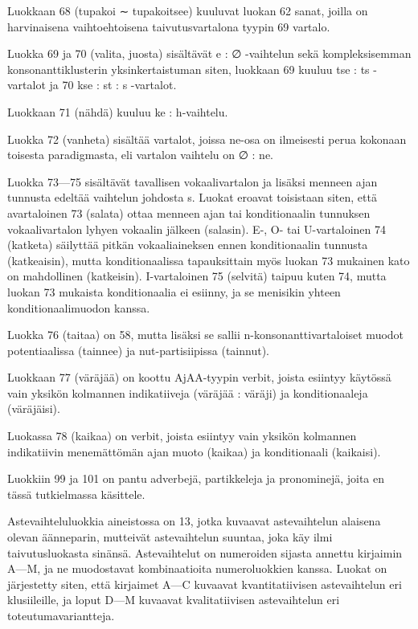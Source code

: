 \documentclass[free]{flammie}
\begin{document}
Luokkaan 68 (tupakoi ∼ tupakoitsee) kuuluvat luokan 62 sanat, joilla on harvinaisena vaihtoehtoisena taivutusvartalona tyypin 69 vartalo.

Luokka 69 ja 70 (valita, juosta) sisältävät e : ∅ -vaihtelun sekä kompleksisemman
konsonanttiklusterin yksinkertaistuman siten, luokkaan 69 kuuluu tse : ts -vartalot ja 70 kse : st : s -vartalot.

Luokkaan 71 (nähdä) kuuluu ke : h-vaihtelu.

Luokka 72 (vanheta) sisältää vartalot, joissa ne-osa on ilmeisesti perua kokonaan
toisesta paradigmasta, eli vartalon vaihtelu on ∅ : ne.

Luokka 73—75 sisältävät tavallisen vokaalivartalon ja lisäksi menneen ajan
tunnusta edeltää vaihtelun johdosta s. Luokat eroavat toisistaan siten, että avartaloinen 73 (salata) ottaa menneen ajan tai konditionaalin tunnuksen vokaalivartalon lyhyen vokaalin jälkeen (salasin). E-, O- tai U-vartaloinen 74 (katketa)
säilyttää pitkän vokaaliaineksen ennen konditionaalin tunnusta (katkeaisin), mutta konditionaalissa tapauksittain myös luokan 73 mukainen kato on mahdollinen
(katkeisin). I-vartaloinen 75 (selvitä) taipuu kuten 74, mutta luokan 73 mukaista
konditionaalia ei esiinny, ja se menisikin yhteen konditionaalimuodon kanssa.

Luokka 76 (taitaa) on 58, mutta lisäksi se sallii n-konsonanttivartaloiset muodot
potentiaalissa (tainnee) ja nut-partisiipissa (tainnut).

Luokkaan 77 (väräjää) on koottu AjAA-tyypin verbit, joista esiintyy käytössä
vain yksikön kolmannen indikatiiveja (väräjää : väräji) ja konditionaaleja (väräjäisi).

Luokassa 78 (kaikaa) on verbit, joista esiintyy vain yksikön kolmannen indikatiivin menemättömän ajan muoto (kaikaa) ja konditionaali (kaikaisi).

Luokkiin 99 ja 101 on pantu adverbejä, partikkeleja ja pronominejä, joita en tässä
tutkielmassa käsittele.

Astevaihteluluokkia aineistossa on 13, jotka kuvaavat astevaihtelun alaisena olevan äänneparin, mutteivät astevaihtelun suuntaa, joka käy ilmi taivutusluokasta
sinänsä. Astevaihtelut on numeroiden sijasta annettu kirjaimin A—M, ja ne muodostavat kombinaatioita numeroluokkien kanssa. Luokat on järjestetty siten, että kirjaimet A—C kuvaavat kvantitatiivisen astevaihtelun eri klusiileille, ja loput
D—M kuvaavat kvalitatiivisen astevaihtelun eri toteutumavariantteja.
\end{document}
